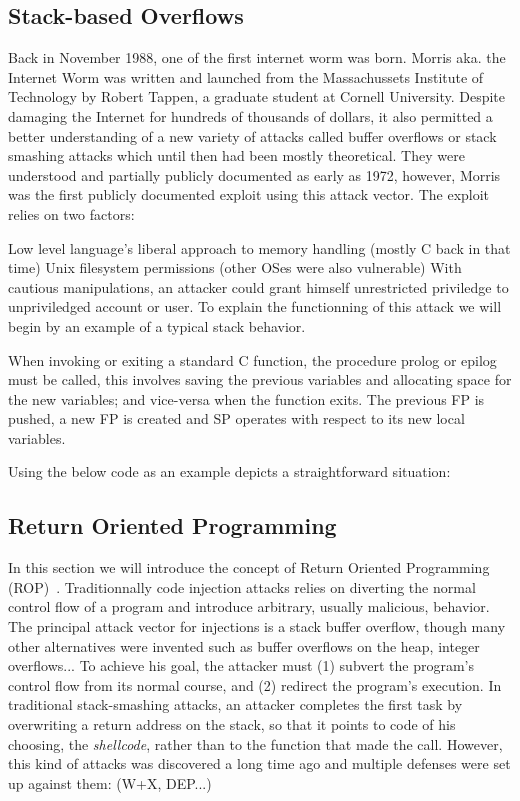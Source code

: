 \documentclass[10pt,twocolumn]{article}
\begin{document}
\subsection{Stack-based Overflows}
Back in November 1988, one of the first internet worm was born. Morris aka. the
Internet Worm was written and launched from the Massachussets Institute of
Technology by Robert Tappen, a graduate student at Cornell University. Despite
damaging the Internet for hundreds of thousands of dollars, it also permitted a
better understanding of a new variety of attacks called buffer overflows or
stack smashing attacks which until then had been mostly theoretical. They were
understood and partially publicly documented as early as 1972, however, Morris
was the first publicly documented exploit using this attack vector. The exploit
~\cite{one_stacksmashing_1996} relies on two factors:

Low level language's liberal approach to memory handling (mostly C back in that
time) Unix filesystem permissions (other OSes were also vulnerable) With
cautious manipulations, an attacker could grant himself unrestricted priviledge
to unpriviledged account or user. To explain the functionning of this attack we
will begin by an example of a typical stack behavior.

When invoking or exiting a standard C function, the procedure prolog or epilog
must be called, this involves saving the previous variables and allocating
space for the new variables; and vice-versa when the function exits. The
previous FP is pushed, a new FP is created and SP operates with respect to its
new local variables.

Using the below code as an example depicts a straightforward
situation:

\subsection{Return Oriented Programming}
In this section we will introduce the concept of Return Oriented Programming
(ROP)~\cite{roemer_return-oriented_2012}. Traditionnally code injection attacks
relies on diverting the normal control flow of a program and introduce
arbitrary, usually malicious, behavior. The principal attack vector for
injections is a stack buffer overflow, though many other alternatives were
invented such as buffer overflows on the heap, integer overflows... To achieve
his goal, the attacker must (1) subvert the program's control flow from its
normal course, and (2) redirect the program's execution. In traditional
stack-smashing attacks, an attacker completes the first task by overwriting a
return address on the stack, so that it points to code of his choosing, the
\textit{shellcode}, rather than to the function that made the call. However,
this kind of attacks was discovered a long time ago and multiple defenses were
set up against them: (W+X, DEP...)
\end{document}
